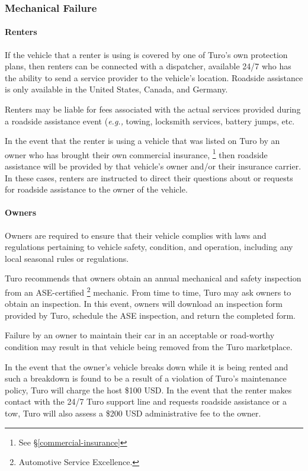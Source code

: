\documentclass[review,12pt]{elsarticle}
\begin{document}
  \subsubsection{Mechanical Failure}
    \paragraph{Renters}
    If the vehicle that a renter is using is covered by one of Turo's own protection plans, then renters can be connected with a dispatcher, available 24/7 who has the ability to send a service provider to the vehicle's location. Roadside assistance is only available in the United States, Canada, and Germany.

    Renters may be liable for fees associated with the actual services provided during a roadside assistance event (\emph{e.g.,} towing, locksmith services, battery jumps, etc.

    In the event that the renter is using a vehicle that was listed on Turo by an owner who has brought their own commercial insurance,
    \footnote{See \S\ref{commercial-insurance}
    }
    then roadside assistance will be provided by that vehicle's owner and/or their insurance carrier. In these cases, renters are instructed to direct their questions about or requests for roadside assistance to the owner of the vehicle.

    \paragraph{Owners}
    Owners are required to ensure that their vehicle complies with laws and regulations pertaining to vehicle safety, condition, and operation, including any local seasonal rules or regulations.

    Turo recommends that owners obtain an annual mechanical and safety inspection from an ASE-certified
    \footnote{Automotive Service Excellence.
    }
    mechanic. From time to time, Turo may ask owners to obtain an inspection. In this event, owners will download an inspection form provided by Turo, schedule the ASE inspection, and return the completed form.

    Failure by an owner to maintain their car in an acceptable or road-worthy condition may result in that vehicle being removed from the Turo marketplace.

    In the event that the owner's vehicle breaks down while it is being rented and such a breakdown is found to be a result of a violation of Turo's maintenance policy, Turo will charge the host \$100 USD. In the event that the renter makes contact with the 24/7 Turo support line and requests roadside assistance or a tow, Turo will also assess a \$200 USD administrative fee to the owner.
\end{document}
